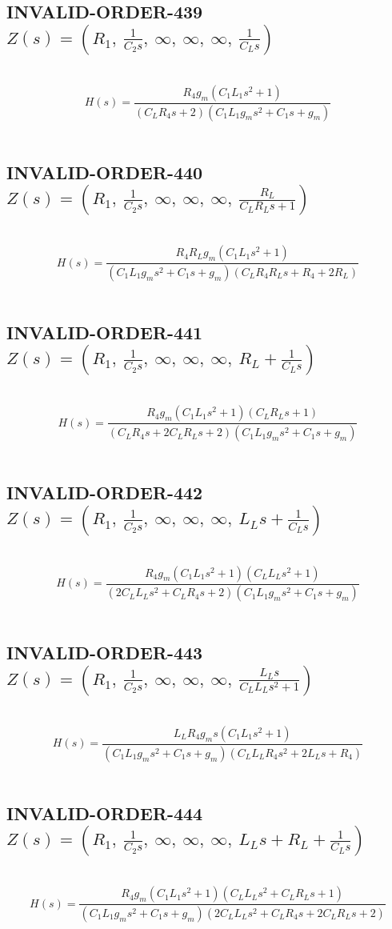 \documentclass{article}
\begin{document}
\subsection{INVALID-ORDER-439 $Z(s) = \left( R_{1}, \  \frac{1}{C_{2} s}, \  \infty, \  \infty, \  \infty, \  \frac{1}{C_{L} s}\right)$ } \ 
\textbf{\[H(s) = \frac{R_{4} g_{m} \left(C_{1} L_{1} s^{2} + 1\right)}{\left(C_{L} R_{4} s + 2\right) \left(C_{1} L_{1} g_{m} s^{2} + C_{1} s + g_{m}\right)}\] } \ 
\subsection{INVALID-ORDER-440 $Z(s) = \left( R_{1}, \  \frac{1}{C_{2} s}, \  \infty, \  \infty, \  \infty, \  \frac{R_{L}}{C_{L} R_{L} s + 1}\right)$ } \ 
\textbf{\[H(s) = \frac{R_{4} R_{L} g_{m} \left(C_{1} L_{1} s^{2} + 1\right)}{\left(C_{1} L_{1} g_{m} s^{2} + C_{1} s + g_{m}\right) \left(C_{L} R_{4} R_{L} s + R_{4} + 2 R_{L}\right)}\] } \ 
\subsection{INVALID-ORDER-441 $Z(s) = \left( R_{1}, \  \frac{1}{C_{2} s}, \  \infty, \  \infty, \  \infty, \  R_{L} + \frac{1}{C_{L} s}\right)$ } \ 
\textbf{\[H(s) = \frac{R_{4} g_{m} \left(C_{1} L_{1} s^{2} + 1\right) \left(C_{L} R_{L} s + 1\right)}{\left(C_{L} R_{4} s + 2 C_{L} R_{L} s + 2\right) \left(C_{1} L_{1} g_{m} s^{2} + C_{1} s + g_{m}\right)}\] } \ 
\subsection{INVALID-ORDER-442 $Z(s) = \left( R_{1}, \  \frac{1}{C_{2} s}, \  \infty, \  \infty, \  \infty, \  L_{L} s + \frac{1}{C_{L} s}\right)$ } \ 
\textbf{\[H(s) = \frac{R_{4} g_{m} \left(C_{1} L_{1} s^{2} + 1\right) \left(C_{L} L_{L} s^{2} + 1\right)}{\left(2 C_{L} L_{L} s^{2} + C_{L} R_{4} s + 2\right) \left(C_{1} L_{1} g_{m} s^{2} + C_{1} s + g_{m}\right)}\] } \ 
\subsection{INVALID-ORDER-443 $Z(s) = \left( R_{1}, \  \frac{1}{C_{2} s}, \  \infty, \  \infty, \  \infty, \  \frac{L_{L} s}{C_{L} L_{L} s^{2} + 1}\right)$ } \ 
\textbf{\[H(s) = \frac{L_{L} R_{4} g_{m} s \left(C_{1} L_{1} s^{2} + 1\right)}{\left(C_{1} L_{1} g_{m} s^{2} + C_{1} s + g_{m}\right) \left(C_{L} L_{L} R_{4} s^{2} + 2 L_{L} s + R_{4}\right)}\] } \ 
\subsection{INVALID-ORDER-444 $Z(s) = \left( R_{1}, \  \frac{1}{C_{2} s}, \  \infty, \  \infty, \  \infty, \  L_{L} s + R_{L} + \frac{1}{C_{L} s}\right)$ } \ 
\textbf{\[H(s) = \frac{R_{4} g_{m} \left(C_{1} L_{1} s^{2} + 1\right) \left(C_{L} L_{L} s^{2} + C_{L} R_{L} s + 1\right)}{\left(C_{1} L_{1} g_{m} s^{2} + C_{1} s + g_{m}\right) \left(2 C_{L} L_{L} s^{2} + C_{L} R_{4} s + 2 C_{L} R_{L} s + 2\right)}\] } \ 
\end{document}

